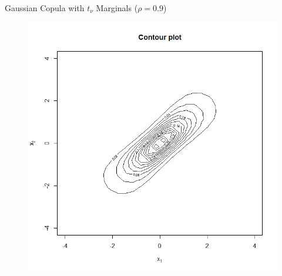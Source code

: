 \documentclass[11pt]{beamer}
\theoremstyle{plain}
\theoremstyle{definition}
\theoremstyle{remark}
\begin{document}
\begin{frame}{Gaussian Copula with $t_\nu$ Marginals ($\rho = 0.9$)}
\begin{figure}[ht]
\begin{minipage}[b]{0.45\linewidth}
            \includegraphics[width=\textwidth]{fig/gauss_t_contour_0_9.png}
        \end{minipage}
    \end{figure}
\end{frame}
\end{document}
